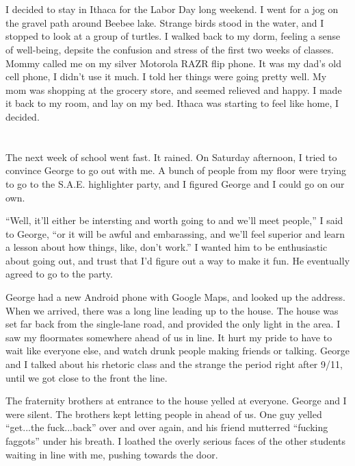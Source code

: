 \section{}

I decided to stay in Ithaca for the Labor Day long weekend.  I went for a jog on
the gravel path around Beebee lake.  Strange birds stood in the water, and I
stopped to look at a group of turtles.  I walked back to my dorm, feeling a
sense of well-being, depsite the confusion and stress of the first two weeks of
classes.  Mommy called me on my silver Motorola RAZR flip phone.  It was my
dad's old cell phone, I didn't use it much.  I told her things were going pretty
well.  My mom was shopping at the grocery store, and seemed relieved and happy.
I made it back to my room, and lay on my bed.  Ithaca was starting to feel like
home, I decided.  

\section{}

The next week of school went fast.  It rained.  On Saturday afternoon, I tried
to convince George to go out with me.  A bunch of people from my floor were
trying to go to the S.A.E. highlighter party, and I figured George and I could
go on our own.

``Well, it'll either be intersting and worth going to and we'll meet people,'' I
said to George, ``or it will be awful and embarassing, and we'll feel superior
and learn a lesson about how things, like, don't work.''  I wanted him to be
enthusiastic about going out, and trust that I'd figure out a way to make it
fun.  He eventually agreed to go to the party.  

George had a new Android phone with Google Maps, and looked up the address.
When we arrived, there was a long line leading up to the house.  The house was
set far back from the single-lane road, and provided the only light in the area.
I saw my floormates somewhere ahead of us in line.   It hurt my pride to have to
wait like everyone else, and watch drunk people making friends or talking.
George and I talked about his rhetoric class and the strange the period right
after 9/11, until we got close to the front the line.
 
The fraternity brothers at entrance to the house yelled at everyone.  George and
I were silent.  The brothers kept letting people in ahead of us.  One guy yelled
``get...the fuck...back'' over and over again, and his friend mutterred
``fucking faggots'' under his breath.  I loathed the overly serious faces of the
other students waiting in line with me, pushing towards the door.

